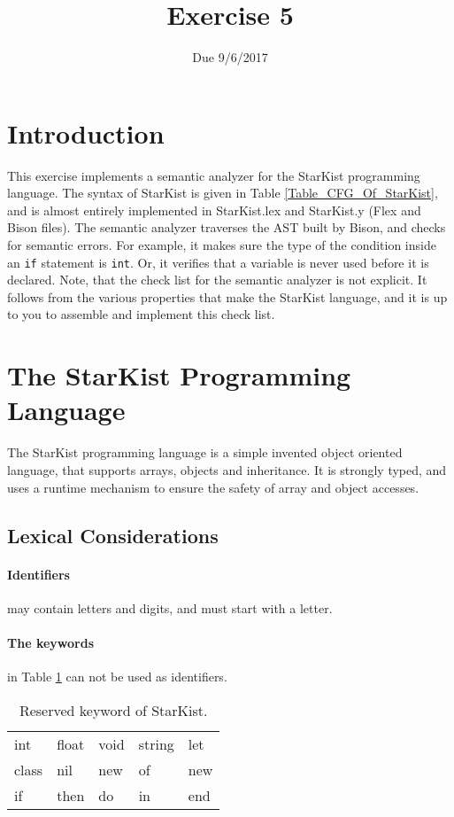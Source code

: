 \documentclass{article}
\begin{document}
\title{Exercise 5}
\date{Due 9/6/2017}
\maketitle

\section{Introduction}
This exercise implements a semantic analyzer for the StarKist
programming language.
The syntax of StarKist is given in Table \ref{Table_CFG_Of_StarKist},
and is almost entirely implemented in StarKist.lex
and StarKist.y (Flex and Bison files).
The semantic analyzer traverses the AST built by Bison,
and checks for semantic errors.
For example, it makes sure the type of the condition inside an \verb"if"
statement is \verb"int".
Or, it verifies that a variable is never used
before it is declared.
Note, that the check list for the semantic analyzer is not explicit.
It follows from the various properties that make the StarKist language,
and it is up to you to assemble and implement this check list.
\section{The StarKist Programming Language}
The StarKist programming language is a simple invented object oriented language,
that supports arrays, objects and inheritance.
It is strongly typed, and uses a runtime mechanism to ensure
the safety of array and object accesses.
\subsection{Lexical Considerations}
\paragraph{Identifiers} may contain letters and digits, and must start with a letter.
\paragraph{The keywords} in Table \ref{Table_Reserved_Keywords_of_StarKist} can not
be used as identifiers.
\begin{table}[h]
\centering
\begin{tabular}{ l l l l l}
  int   & float & void & string & let \\
  class & nil   & new  & of     & new \\
  if    & then  & do   & in     & end \\
\end{tabular}
\caption{
Reserved keyword of StarKist.
\label{Table_Reserved_Keywords_of_StarKist}}
\end{table}
\end{document}
